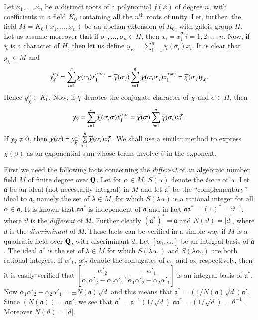 Let $x_{1},\ldots,x_{n}$ be $n$ distinct roots of a polynomial $f(x)$
of degree $n$, with coefficients in a field $K_{0}$ containing all the
$n^{\text{th}}$ roots of unity. Let, further, the field
$M=K_{0}(x_{1},\ldots,x_{n})$ be an abelian extension of $K_{0}$, with
galois group $H$. Let us assume moreover that if
$\sigma_{1},\ldots,\sigma_{n}\in H$, then
$x_{i}=x^{\sigma_{i}}_{1}i=1,2,\ldots,n$. Now, if $\chi$ is a
character of $H$, then let us define
$y_{\chi}=\sum\limits^{n}_{i=1}\chi(\sigma_{i})x_{i}$. It is clear
that $y_{\chi}\in M$ and 
$$
y^{\sigma_{j}}_{\chi}=\sum^{n}_{i=1}\chi(\sigma_{i})x^{\sigma_{i}\sigma_{j}}_{1}=\overline{\chi}(\sigma_{j})\sum^{n}_{i=1}\chi(\sigma_{i}\sigma_{j})x^{\sigma_{i}\sigma_{j}}_{1}=\overline{\chi}(\sigma_{j})y_{\chi}. 
$$
Hence $y^{n}_{\chi}\in K_{0}$. Now, if $\overline{\chi}$ denotes the
conjugate character of $\chi$ and $\sigma\in H$, then 
$$
y_{\overline{\chi}}=\sum^{n}_{i=1}\overline{\chi}(\sigma_{i}\sigma)x^{\sigma_{i}\sigma}_{1}=\overline{\chi}(\sigma)\sum^{n}_{i=1}\overline{\chi}(\sigma_{i})x^{\sigma}_{i}.
$$\pageoriginale
If $y_{\overline{\chi}}\neq 0$, then
$\chi(\sigma)=y^{-1}_{\overline{\chi}}\sum\limits^{n}_{i=1}\overline{\chi}(\sigma_{i})x^{\sigma}_{i}$. We
shall use a similar method to express $\chi(\beta)$ as an exponential
sum whose terms involve $\beta$ in the exponent.

First we need the following facts concerning the {\em different} of an
algebraic number field $M$ of finite degree over $\mathbf{Q}$. Let for
$\alpha\in M$, $S(\alpha)$ denote the {\em trace} of $\alpha$. Let
$\mathfrak{a}$ be an ideal (not necessarily integral) in $M$ and let
$\mathfrak{a}^{\ast}$ be the ``complementary'' ideal to
$\mathfrak{a}$, namely the set of $\lambda\in M$, for which
$S(\lambda\alpha)$ is a rational integer for all
$\alpha\in\mathfrak{a}$. It is known that $\mathfrak{aa}^{\ast}$ is
independent of $\mathfrak{a}$ and in fact
$\mathfrak{aa}^{\ast}=(1)^{\ast}=\vartheta^{-1}$, where $\vartheta$ is
the {\em different} of $M$. Further clearly
$(\mathfrak{a}^{\ast})^{\ast}=\mathfrak{a}$ and $N(\vartheta)=|d|$,
where $d$ is the {\em discriminant} of $M$. These facts can be
verified in a simple way if $M$ is a quadratic field over $\mathbf{Q}$, with
discriminant $d$. Let $[\alpha_{1},\alpha_{2}]$ be an integral basis
of $\mathfrak{a}$. The ideal $\mathfrak{a}^{\ast}$ is the set of
$\lambda\in M$ for which $S(\lambda\alpha_{1})$ and
$S(\lambda\alpha_{2})$ are both rational integers. If $\alpha'_{1}$,
$\alpha'_{2}$ denote the conjugates of $\alpha_{1}$ and $\alpha_{2}$
respectively, then it is easily verified that
$\left[\dfrac{\alpha'_{2}}{\alpha_{1}\alpha'_{2}-\alpha_{2}\alpha'_{1}},\dfrac{-\alpha'_{1}}{\alpha_{1}\alpha'_{2}-\alpha_{2}\alpha'_{1}}\right]$
is an integral basis of $\mathfrak{a}^{\ast}$. Now
$\alpha_{1}\alpha'_{2}-\alpha_{2}\alpha'_{1}=\pm
N(\mathfrak{a})\sqrt{d}$ and this means that
$\mathfrak{a}^{\ast}=(1/N(\mathfrak{a})\sqrt{d})\mathfrak{a}'$. Since
$(N(\mathfrak{a}))=\mathfrak{aa}'$, we see that
$\mathfrak{a}^{\ast}=\mathfrak{a}^{-1}(1/\sqrt{d})$ \ie
$\mathfrak{aa}^{\ast}=(1/\sqrt{d})=\vartheta^{-1}$. Moreover
$N(\vartheta)=|d|$.

